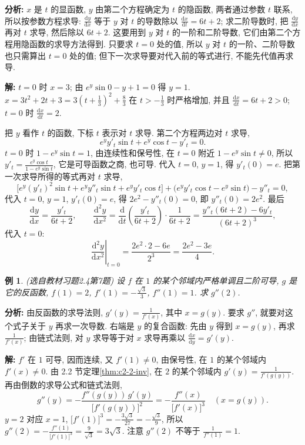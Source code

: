 \documentclass[UTF8,openany]{ctexbook}
\theoremstyle{chinesetextbook}
\newtheorem{example}{例}[section]
\newenvironment{cnsolution}{\par\indent\textbf{解:} \ignorespaces}{\par}
\newcommand{\dd}{\mathrm d}
\begin{document}
\par\indent\textbf{分析:} $x$ 是 $t$ 的显函数, $y$ 由第二个方程确定为 $t$ 的隐函数, 两者通过参数 $t$ 联系, 所以按参数方程求导: $\displaystyle\frac{\dd y}{\dd x}$ 等于 $y$ 对 $t$ 的导数除以 $\displaystyle\frac{\dd x}{\dd t}=6t+2$; 求二阶导数时, 把 $\displaystyle\frac{\dd y}{\dd x}$ 再对 $t$ 求导, 然后除以 $6t+2$. 这要用到 $y$ 对 $t$ 的一阶和二阶导数, 它们由第二个方程用隐函数的求导方法得到. 只要求 $t=0$ 处的值, 所以 $y$ 对 $t$ 的一阶、二阶导数也只需算出 $t=0$ 处的值; 但下一次求导要对代入前的等式进行, 不能先代值再求导.
\begin{cnsolution}
$t=0$ 时 $x=3$; 由 $e^y\sin0-y+1=0$ 得 $y=1$. $\displaystyle x=3t^2+2t+3=3\left(t+\frac13\right)^2+\frac83$ 在 $\displaystyle t>-\frac13$ 时严格增加, 并且 $\displaystyle\frac{\dd x}{\dd t}=6t+2>0$; $t=0$ 时 $\displaystyle\frac{\dd x}{\dd t}=2$.

把 $y$ 看作 $t$ 的函数, 下标 $t$ 表示对 $t$ 求导. 第二个方程两边对 $t$ 求导,
\[
e^yy'_t\sin t+e^y\cos t-y'_t=0.
\]
$t=0$ 时 $1-e^y\sin t=1$, 由连续性和保号性, 在 $t=0$ 附近 $1-e^y\sin t\ne0$, 所以 $\displaystyle y'_t=\frac{e^y\cos t}{1-e^y\sin t}$, 它是可导函数之商, 也可导. 代入 $t=0$, $y=1$, 得 $y'_t(0)=e$. 把第一次求导所得的等式再对 $t$ 求导,
\[
\bigl[e^y(y'_t)^2\sin t+e^yy''_t\sin t+e^yy'_t\cos t\bigr]+\bigl(e^yy'_t\cos t-e^y\sin t\bigr)-y''_t=0,
\]
代入 $t=0$, $y=1$, $y'_t(0)=e$, 得 $2e^2-y''_t(0)=0$, 即 $y''_t(0)=2e^2$. 最后
\[
\frac{\dd y}{\dd x}=\frac{y'_t}{6t+2},\qquad\frac{\dd^2y}{\dd x^2}=\frac{\dd}{\dd t}\left(\frac{y'_t}{6t+2}\right)\cdot\frac1{6t+2}=\frac{y''_t(6t+2)-6y'_t}{(6t+2)^3},
\]
代入 $t=0$:
\[
\left.\frac{\dd^2y}{\dd x^2}\right|_{t=0}=\frac{2e^2\cdot2-6e}{2^3}=\frac{2e^2-3e}4.
\]
\end{cnsolution}
\begin{example}\label{ex:c2-h4-7}
\textnormal{(选自教材习题2.4第7题)} 设 $f$ 在 $1$ 的某个邻域内严格单调且二阶可导, $g$ 是它的反函数, $f(1)=2$, $\displaystyle f'(1)=-\frac{\sqrt3}3$, $f''(1)=1$. 求 $g''(2)$.
\end{example}
\par\indent\textbf{分析:} 由反函数的求导法则, $\displaystyle g'(y)=\frac1{f'(x)}$, 其中 $x=g(y)$. 要求 $g''$, 就要对这个式子关于 $y$ 再求一次导数. 右端是 $y$ 的复合函数: 先由 $y$ 得到 $x=g(y)$, 再求 $\displaystyle\frac1{f'(x)}$; 由链式法则, 对 $y$ 求导等于对 $x$ 求导再乘以 $\displaystyle\frac{\dd x}{\dd y}=g'(y)$.
\begin{cnsolution}
$f'$ 在 $1$ 可导, 因而连续, 又 $f'(1)\ne0$, 由保号性, 在 $1$ 的某个邻域内 $f'(x)\ne0$. 由 2.2 节定理\ref{thm:c2-2-inv}, 在 $2$ 的某个邻域内 $\displaystyle g'(y)=\frac1{f'(g(y))}$. 再由倒数的求导公式和链式法则,
\[
g''(y)=-\frac{f''(g(y))\,g'(y)}{\bigl[f'(g(y))\bigr]^2}=-\frac{f''(x)}{\bigl[f'(x)\bigr]^3}\quad(x=g(y)).
\]
$y=2$ 对应 $x=1$, $\displaystyle\bigl[f'(1)\bigr]^3=-\frac{3\sqrt3}{27}=-\frac{\sqrt3}9$, 所以 $\displaystyle g''(2)=-\frac{f''(1)}{\bigl[f'(1)\bigr]^3}=\frac9{\sqrt3}=3\sqrt3$. 注意 $g''(2)$ 不等于 $\displaystyle\frac1{f''(1)}=1$.
\end{cnsolution}
\end{document}
